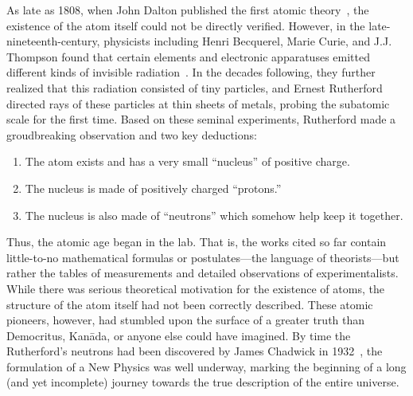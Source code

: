 \begin{dissertationintroduction}
As late as 1808, when John Dalton published the first\footnotemark{} atomic theory~\cite{Dalton1805, Dalton1808}, the existence of the atom itself could not be directly verified. 
However, in the late-nineteenth-century, physicists including Henri Becquerel, Marie Curie, and J.J. Thompson found that certain elements and electronic apparatuses emitted different kinds of invisible radiation~\cite{Becquerel, Curie, RADVANYI2017544, Thompson}. 
In the decades following, they further realized that this radiation consisted of tiny particles\footnotemark{}, and Ernest Rutherford directed rays of these particles at thin sheets of metals, probing the subatomic scale for the first time. 
Based on these seminal experiments, Rutherford made a groudbreaking observation and two key deductions: %
\begin{enumerate}
    \item The atom exists\footnotemark{} and has a very small ``nucleus'' of positive charge.
    \item The nucleus is made of positively charged ``protons.''
    \item The nucleus is also made of ``neutrons'' which somehow help keep it together.
\end{enumerate}
Thus, the atomic age began in the lab. 
That is, the works cited so far contain little-to-no mathematical formulas or postulates---the language of theorists---but rather the tables of measurements and detailed observations of experimentalists. 
While there was serious theoretical motivation for the existence of atoms\footnotemark{}, the structure of the atom itself had not been correctly described. 
These atomic pioneers, however, had stumbled upon the surface of a greater truth than Democritus, Kan\=ada, or anyone else could have imagined. 
By time the Rutherford's neutrons had been discovered by James Chadwick in 1932~\cite{Chadwick1932}, the formulation of a New Physics was well underway, marking the beginning of a long (and yet incomplete) journey towards the true description of the entire universe. 


\end{dissertationintroduction}
